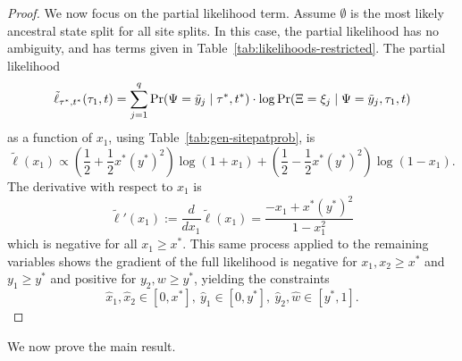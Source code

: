 \begin{proof}
We now focus on the partial likelihood term.
Assume $\emptyset$ is the most likely ancestral state split for all site splits.
In this case, the partial likelihood has no ambiguity, and has terms given in Table~\ref{tab:likelihoods-restricted}.
The partial likelihood
\[
\tilde{\ell}_{\tau^*,t^*}(\tau_1, t) = \sum_{j=1}^q \Pr(\Psi=\tilde{y}_j \mid \tau^*, t^*)\cdot\log \Pr(\Xi=\xi_j \mid \Psi = \tilde{y}_j, \tau_1, t)
\]
as a function of $x_1$, using Table~\ref{tab:gen-sitepatprob}, is
\[
\tilde{\ell}(x_1) \propto \left(\frac{1}{2}+\frac{1}{2}x^*(y^*)^2\right)\log(1+x_1) + \left(\frac{1}{2}-\frac{1}{2}x^*(y^*)^2\right)\log(1-x_1).
\]
The derivative with respect to $x_1$ is
\[
\tilde{\ell}'(x_1) := \frac{d}{dx_1} \tilde{\ell}(x_1) = \frac{-x_1+x^*(y^*)^2}{1-x_1^2}
\]
which is negative for all $x_1 \ge x^*$.
This same process applied to the remaining variables shows the gradient of the full likelihood is negative for $x_1,x_2 \ge x^*$ and $y_1 \ge y^*$ and positive for $y_2,w \ge y^*$, yielding the constraints
\[
\hat{x}_1,\hat{x}_2 \in [0, x^*], \ \hat{y}_1 \in [0, y^*], \ \hat{y}_2,\hat{w} \in [y^*, 1].
\]
\end{proof}

We now prove the main result.

\topoInconsist*

